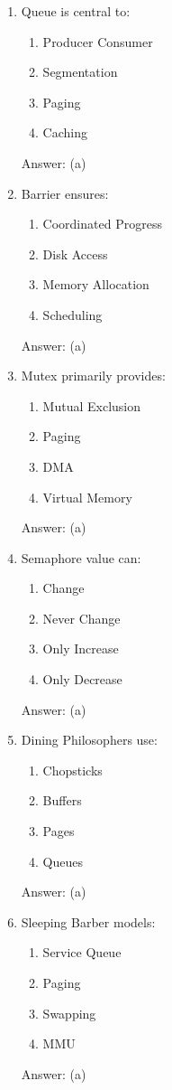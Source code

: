 \begin{enumerate}
\item Queue is central to:
\begin{enumerate}[label=(\alph*)]
\item Producer Consumer
\item Segmentation
\item Paging
\item Caching
\end{enumerate}
Answer: (a)

\item Barrier ensures:
\begin{enumerate}[label=(\alph*)]
\item Coordinated Progress
\item Disk Access
\item Memory Allocation
\item Scheduling
\end{enumerate}
Answer: (a)

\item Mutex primarily provides:
\begin{enumerate}[label=(\alph*)]
\item Mutual Exclusion
\item Paging
\item DMA
\item Virtual Memory
\end{enumerate}
Answer: (a)

\item Semaphore value can:
\begin{enumerate}[label=(\alph*)]
\item Change
\item Never Change
\item Only Increase
\item Only Decrease
\end{enumerate}
Answer: (a)

\item Dining Philosophers use:
\begin{enumerate}[label=(\alph*)]
\item Chopsticks
\item Buffers
\item Pages
\item Queues
\end{enumerate}
Answer: (a)

\item Sleeping Barber models:
\begin{enumerate}[label=(\alph*)]
\item Service Queue
\item Paging
\item Swapping
\item MMU
\end{enumerate}
Answer: (a)


\end{enumerate}
